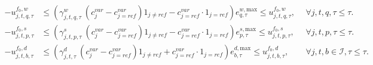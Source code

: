 \begin{align}
-u_{j, t, q, \tau}^{f_0, w} & \le \left ( \gamma_{j,t,q,\tau}^{w} \: \left ( c^{var}_{j} - c^{var}_{j=ref} \right ) 1_{j\neq{ref}} - c^{var}_{j=ref}\cdot{}1_{j=ref} \right ) e_{q,\tau}^{w, \text{max}} \le u_{j, t, q,\tau}^{f_0, w}, \ \ & \forall j, t, q, \tau \leqslant \tau.\\
-u_{j, t, p, \tau}^{f_0, s} & \le \left ( \gamma_{j,t,p,\tau}^{s} \: \left ( c^{var}_{j} - c^{var}_{j=ref} \right ) 1_{j\neq{ref}} - c^{var}_{j=ref}\cdot{}1_{j=ref}\right ) e_{p,\tau}^{s, \text{max}} \le u_{j, t, p, \tau}^{f_0, s}, \ \ & \forall j, t, p, \tau \leqslant \tau. \\
-u_{j, t, b,\tau}^{f_0, d} & \le \left ( \gamma_{j,t,\tau}^{d} \: \left ( c^{var}_{j} - c^{var}_{j=ref} \right ) 1_{j\neq{ref}} + c^{var}_{j=ref}\cdot{}1_{j=ref} \right ) e_{b,\tau}^{d, \text{max}} \le u_{j, t, b, \tau}^{f_0, d}, \ \ & \forall j, t, b \in \mathcal{I} , \tau \leqslant \tau.
\end{align}